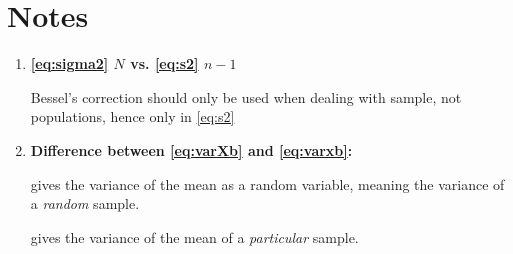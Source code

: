 \documentclass[a4]{article}
\begin{document}
\section{Notes}
\begin{enumerate}
	\item \textbf{\cref{eq:sigma2} $N$ vs. \cref{eq:s2} $n-1$}

	      Bessel's correction should only be used when dealing with sample, not populations, hence only in \cref{eq:s2}
	\item \textbf{Difference between \cref{eq:varXb} and \cref{eq:varxb}:}

	       gives the variance of the mean as a random variable, meaning the variance of a \textit{random} sample.

	       gives the variance of the mean of a \textit{particular} sample.
\end{enumerate}
\end{document}
